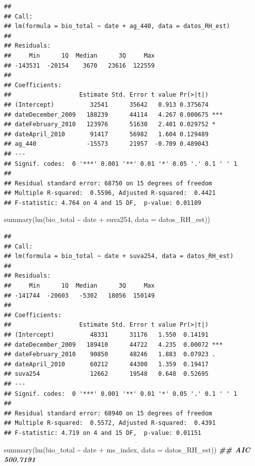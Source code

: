\documentclass[
]{book}
\newenvironment{Shaded}{\begin{snugshade}}{\end{snugshade}}
\newcommand{\AttributeTok}[1]{\textcolor[rgb]{0.77,0.63,0.00}{#1}}
\newcommand{\DocumentationTok}[1]{\textcolor[rgb]{0.56,0.35,0.01}{\textbf{\textit{#1}}}}
\newcommand{\FunctionTok}[1]{\textcolor[rgb]{0.00,0.00,0.00}{#1}}
\newcommand{\NormalTok}[1]{#1}
\newcommand{\SpecialCharTok}[1]{\textcolor[rgb]{0.00,0.00,0.00}{#1}}
\begin{document}
\begin{verbatim}
## 
## Call:
## lm(formula = bio_total ~ date + ag_440, data = datos_RH_est)
## 
## Residuals:
##     Min      1Q  Median      3Q     Max 
## -143531  -20154    3670   23616  122559 
## 
## Coefficients:
##                   Estimate Std. Error t value Pr(>|t|)    
## (Intercept)          32541      35642   0.913 0.375674    
## dateDecember_2009   188239      44114   4.267 0.000675 ***
## dateFebruary_2010   123976      51630   2.401 0.029752 *  
## dateApril_2010       91417      56982   1.604 0.129489    
## ag_440              -15573      21957  -0.709 0.489043    
## ---
## Signif. codes:  0 '***' 0.001 '**' 0.01 '*' 0.05 '.' 0.1 ' ' 1
## 
## Residual standard error: 68750 on 15 degrees of freedom
## Multiple R-squared:  0.5596, Adjusted R-squared:  0.4421 
## F-statistic: 4.764 on 4 and 15 DF,  p-value: 0.01109
\end{verbatim}

\begin{Shaded}
\begin{Highlighting}[]
\FunctionTok{summary}\NormalTok{(}\FunctionTok{lm}\NormalTok{(bio\_total }\SpecialCharTok{\textasciitilde{}}\NormalTok{ date }\SpecialCharTok{+}\NormalTok{ suva254, }\AttributeTok{data =}\NormalTok{ datos\_RH\_est))}
\end{Highlighting}
\end{Shaded}

\begin{verbatim}
## 
## Call:
## lm(formula = bio_total ~ date + suva254, data = datos_RH_est)
## 
## Residuals:
##     Min      1Q  Median      3Q     Max 
## -141744  -20603   -5302   18056  150149 
## 
## Coefficients:
##                   Estimate Std. Error t value Pr(>|t|)    
## (Intercept)          48331      31176   1.550  0.14191    
## dateDecember_2009   189410      44722   4.235  0.00072 ***
## dateFebruary_2010    90850      48246   1.883  0.07923 .  
## dateApril_2010       60212      44300   1.359  0.19417    
## suva254              12662      19548   0.648  0.52695    
## ---
## Signif. codes:  0 '***' 0.001 '**' 0.01 '*' 0.05 '.' 0.1 ' ' 1
## 
## Residual standard error: 68940 on 15 degrees of freedom
## Multiple R-squared:  0.5572, Adjusted R-squared:  0.4391 
## F-statistic: 4.719 on 4 and 15 DF,  p-value: 0.01151
\end{verbatim}

\begin{Shaded}
\begin{Highlighting}[]
\FunctionTok{summary}\NormalTok{(}\FunctionTok{lm}\NormalTok{(bio\_total }\SpecialCharTok{\textasciitilde{}}\NormalTok{ date }\SpecialCharTok{+}\NormalTok{ ms\_index, }\AttributeTok{data =}\NormalTok{ datos\_RH\_est)) }\DocumentationTok{\#\# AIC 500.7191}
\end{Highlighting}
\end{Shaded}
\end{document}
